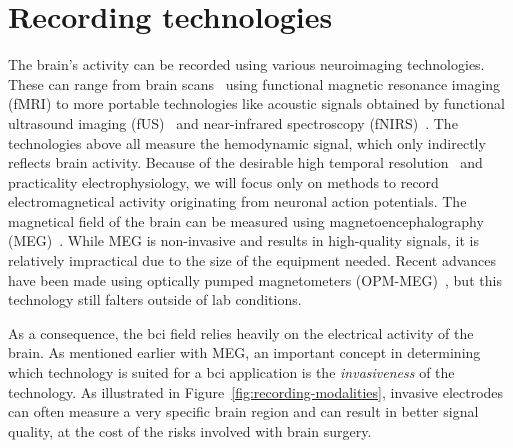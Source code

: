 

\section{Recording technologies}
\label{sec:bci-recording}


The brain's activity can be recorded using various neuroimaging
technologies.
These can range from brain scans~\cite{Weiskopf2004} using functional magnetic resonance imaging
(fMRI) to more portable technologies like acoustic signals obtained by functional ultrasound imaging
(fUS)~\cite{Zheng2023} and near-infrared spectroscopy
(fNIRS)~\cite{Borgheai2020}.
The technologies above all measure the hemodynamic signal, which only indirectly
reflects brain activity.
Because of the desirable high temporal resolution~\cite{Easttom2021} and
practicality electrophysiology, we will focus only on methods to record
electromagnetical activity originating from neuronal action potentials.
The magnetical field of the brain can be measured using magnetoencephalography
(MEG)~\cite{Mellinger2007}.
While MEG is non-invasive and results in high-quality signals, it is relatively
impractical due to the size of the equipment needed.
Recent advances have been made using optically pumped magnetometers
(OPM-MEG)~\cite{Wittevrongel2021}, but this technology still falters outside of
lab conditions.

As a consequence, the \ac{bci} field relies heavily on the
electrical activity of the brain.
As mentioned earlier with MEG, an important concept in determining which
technology is suited for a \ac{bci} application is the \emph{invasiveness} of the technology.
As illustrated in Figure~\ref{fig:recording-modalities}, invasive electrodes can often measure a very specific brain region and can result in better signal quality, at the cost of the risks
involved with brain surgery.

